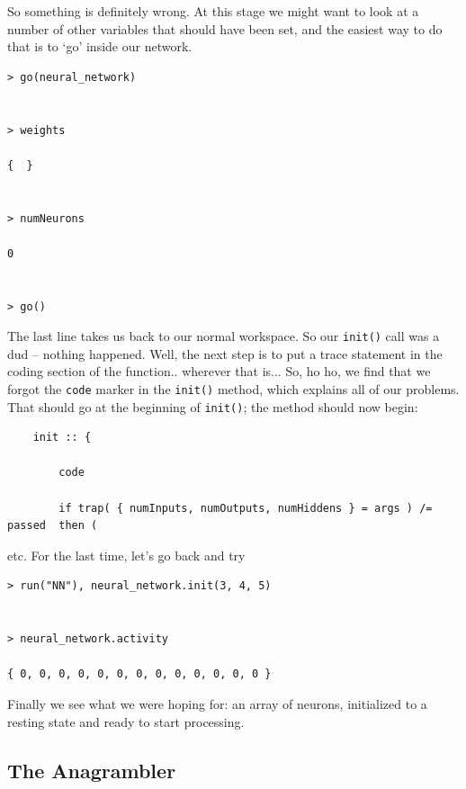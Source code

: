 \documentclass{article}
\newenvironment{code}{
       \begin{list}{}{
               \setlength{\leftmargin}{.4in}
               \setlength{\rightmargin}{0in}
               \setlength{\topsep}{.2in}
       }
       \small
       \item[] }
       { \end{list}   }
\begin{document}
\noindent So something is definitely wrong.  At this stage we might want to look at a number of other variables that should have been set, and the easiest way to do that is to `go' inside our network.

\begin{code} \begin{verbatim}
> go(neural_network)


> weights

{  }


> numNeurons

0


> go()
\end{verbatim} \end{code}

\noindent The last line takes us back to our normal workspace.  So our \verb#init()# call was a dud -- nothing happened.  Well, the next step is to put a trace statement in the coding section of the function.. wherever that is...  So, ho ho, we find that we forgot the \verb#code# marker in the \verb#init()# method, which explains all of our problems.  That should go at the beginning of \verb#init()#; the method should now begin:

\begin{code} \begin{verbatim}
    init :: {
        
        code
        
        if trap( { numInputs, numOutputs, numHiddens } = args ) /= passed  then (
\end{verbatim} \end{code}

etc.  For the last time, let's go back and try

\begin{code} \begin{verbatim}
> run("NN"), neural_network.init(3, 4, 5)


> neural_network.activity

{ 0, 0, 0, 0, 0, 0, 0, 0, 0, 0, 0, 0, 0 }
\end{verbatim} \end{code}

\noindent Finally we see what we were hoping for:  an array of neurons, initialized to a resting state and ready to start processing.



\subsection{The Anagrambler}
\end{document}
